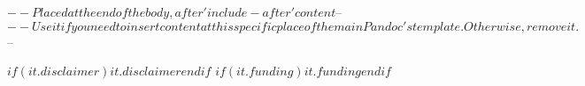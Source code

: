$-- Placed at the end of the body, after 'include-after' content
$-- %
$-- Use it if you need to insert content at this specific place of the main Pandoc's template. Otherwise, remove it.
$-- %

$if(it.disclaimer)$$it.disclaimer$$endif$
$if(it.funding)$$it.funding$$endif$